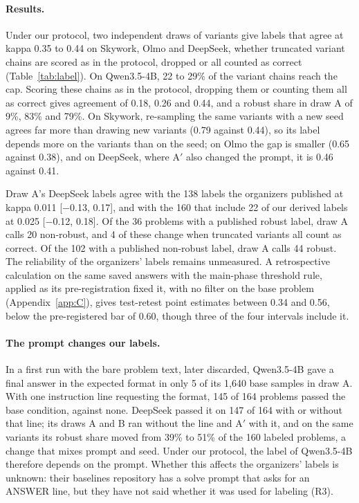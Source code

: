 \documentclass{article}
\begin{document}
\paragraph{Results.} Under our protocol, two independent draws of variants give labels that agree at kappa 0.35 to 0.44 on Skywork, Olmo and DeepSeek, whether truncated variant chains are scored as in the protocol, dropped or all counted as correct (Table~\ref{tab:label}). On Qwen3.5-4B, 22 to 29\% of the variant chains reach the cap. Scoring these chains as in the protocol, dropping them or counting them all as correct gives agreement of 0.18, 0.26 and 0.44, and a robust share in draw A of 9\%, 83\% and 79\%. On Skywork, re-sampling the same variants with a new seed agrees far more than drawing new variants (0.79 against 0.44), so its label depends more on the variants than on the seed; on Olmo the gap is smaller (0.65 against 0.38), and on DeepSeek, where A$'$ also changed the prompt, it is 0.46 against 0.41.

Draw A's DeepSeek labels agree with the 138 labels the organizers published at kappa 0.011 [$-$0.13, 0.17], and with the 160 that include 22 of our derived labels at 0.025 [$-$0.12, 0.18]. Of the 36 problems with a published robust label, draw A calls 20 non-robust, and 4 of these change when truncated variants all count as correct. Of the 102 with a published non-robust label, draw A calls 44 robust. The reliability of the organizers' labels remains unmeasured. A retrospective calculation on the same saved answers with the main-phase threshold rule, applied as its pre-registration fixed it, with no filter on the base problem (Appendix~\ref{app:C}), gives test-retest point estimates between 0.34 and 0.56, below the pre-registered bar of 0.60, though three of the four intervals include it.

\paragraph{The prompt changes our labels.} In a first run with the bare problem text, later discarded, \mbox{Qwen3.5-4B} gave a final answer in the expected format in only 5 of its 1,640 base samples in draw A. With one instruction line requesting the format, 145 of 164 problems passed the base condition, against none. DeepSeek passed it on 147 of 164 with or without that line; its draws A and B ran without the line and A$'$ with it, and on the same variants its robust share moved from 39\% to 51\% of the 160 labeled problems, a change that mixes prompt and seed. Under our protocol, the label of Qwen3.5-4B therefore depends on the prompt. Whether this affects the organizers' labels is unknown: their baselines repository has a solve prompt that asks for an ANSWER line, but they have not said whether it was used for labeling (R3).
\end{document}
